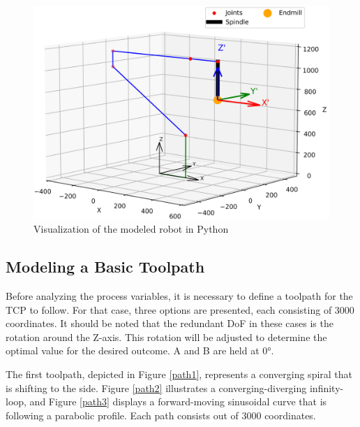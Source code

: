 \newpage
 \begin{figure}[H]
	\centerline{\includegraphics[width=1\textwidth]{figures/robotprog.png}}
	\caption{Visualization of the modeled robot in Python}
	\label{robotprog}
\end{figure}


\subsection{Modeling a Basic Toolpath}\label{MBT}
Before analyzing the process variables, it is necessary to define a toolpath for the \acrshort{TCP} to follow. For that case, three options are presented, each consisting of 3000 coordinates. It should be noted that the redundant \acrshort{DoF} in these cases is the rotation around the Z-axis. This rotation will be adjusted to determine the optimal value for the desired outcome. A and B are held at 0°.

The first toolpath, depicted in Figure \ref{path1}, represents a converging spiral that is shifting to the side. Figure \ref{path2} illustrates a converging-diverging infinity-loop, and Figure \ref{path3} displays a forward-moving sinusoidal curve that is following a parabolic profile. Each path consists out of 3000 coordinates. %

